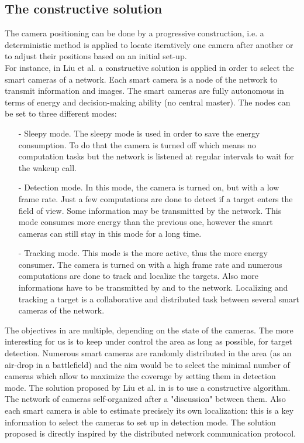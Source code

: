 \subsection{The constructive solution}

The camera positioning can be done by a progressive construction, i.e. a deterministic method is applied to locate iteratively one camera after another or to adjust their positions based on an initial set-up.\\
For instance, in Liu et al. \cite{38*liu2010} a constructive solution is applied in order to select the smart cameras of a network. Each smart camera is  a node of the network to transmit information and images. The smart cameras are fully autonomous in terms of energy and decision-making ability (no central master). 
The nodes can be set to three different modes:
\begin{itemize}
\item[-] Sleepy mode. The sleepy mode is used in order to save the energy consumption. To do that the camera is turned off which means no computation tasks but the network is listened at regular intervals to wait for the wakeup call.   \\

\item[-] Detection mode. In this mode, the camera is turned on, but with a low frame rate. Just a few computations are done to detect if a target enters the field of view. Some information may be transmitted by the network. This mode consumes more energy than the previous one, however the smart cameras can still stay in this mode for a long time.\\

\item[-] Tracking mode. This mode is the more active, thus the more energy consumer. The camera is turned on with a high frame rate and numerous computations are done to track and localize the targets. Also more informations have to be transmitted by and to the network. Localizing and tracking a target is a collaborative and distributed task between several smart cameras of the network.  
\end{itemize}
The objectives in \cite{38*liu2010} are multiple, depending on the state of the cameras. The more interesting for us is to keep under control the area as long as possible, for target detection. Numerous smart cameras are randomly distributed in the area (as an air-drop in a battlefield) and the aim would be to select the minimal number of cameras which allow to maximize the coverage by setting them in detection mode. The solution proposed by Liu et al. in \cite{38*liu2010} is to use a constructive algorithm. The network of cameras self-organized after a "discussion" between them. Also each smart camera is able to estimate precisely its own localization: this is a key information to select the cameras to set up in detection mode. The solution proposed is directly inspired by the distributed network communication protocol. \\
